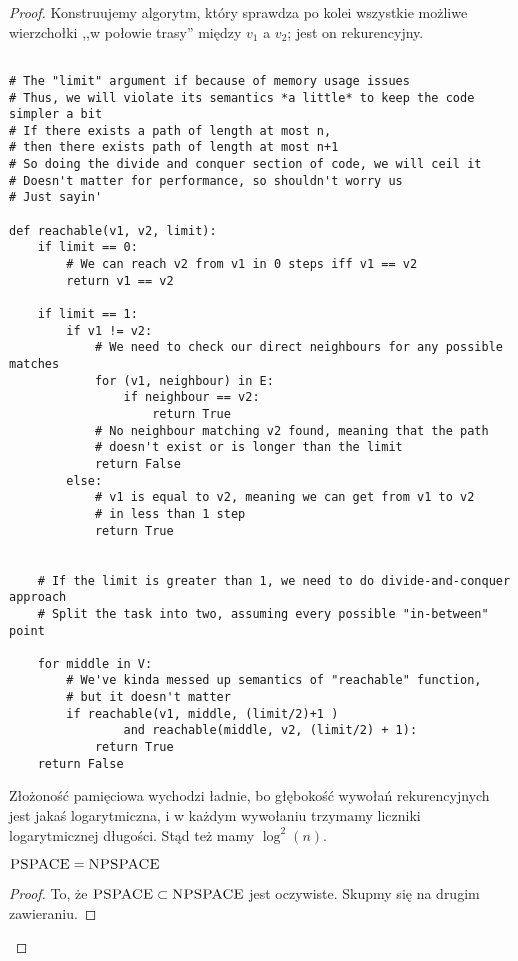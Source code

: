 \begin{proof}
    
    Konstruujemy algorytm, który sprawdza po kolei wszystkie możliwe wierzchołki ,,w połowie trasy'' między \(v_1\) a \(v_2\); jest on rekurencyjny. 

  \begin{verbatim}

# The "limit" argument if because of memory usage issues
# Thus, we will violate its semantics *a little* to keep the code simpler a bit
# If there exists a path of length at most n,
# then there exists path of length at most n+1
# So doing the divide and conquer section of code, we will ceil it
# Doesn't matter for performance, so shouldn't worry us
# Just sayin'
 
def reachable(v1, v2, limit): 
    if limit == 0: 
        # We can reach v2 from v1 in 0 steps iff v1 == v2
        return v1 == v2
        
    if limit == 1:
        if v1 != v2:
            # We need to check our direct neighbours for any possible matches
            for (v1, neighbour) in E:
                if neighbour == v2:
                    return True
            # No neighbour matching v2 found, meaning that the path
            # doesn't exist or is longer than the limit
            return False
        else:
            # v1 is equal to v2, meaning we can get from v1 to v2
            # in less than 1 step
            return True 
            
    
    # If the limit is greater than 1, we need to do divide-and-conquer approach
    # Split the task into two, assuming every possible "in-between" point

    for middle in V:
        # We've kinda messed up semantics of "reachable" function,
        # but it doesn't matter
        if reachable(v1, middle, (limit/2)+1 )
                and reachable(middle, v2, (limit/2) + 1):
            return True
    return False 
\end{verbatim}
    
    Złożoność pamięciowa wychodzi ładnie, bo głębokość wywołań rekurencyjnych jest jakaś logarytmiczna, i w każdym wywołaniu trzymamy liczniki logarytmicznej długości. Stąd też mamy \(\log^2(n)\). 
    
    \begin{corollary}
        \(\textsc{PSPACE} = \textsc{NPSPACE}\) 
    \end{corollary}
    \begin{proof}
        To, że \( \textsc{PSPACE} \subset \textsc{NPSPACE} \) jest oczywiste. Skupmy się na drugim zawieraniu. 
    

\end{proof}
\end{proof}
